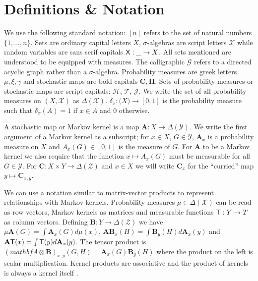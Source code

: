 
\section{Definitions \& Notation}\label{sec:dfin}

We use the following standard notation: $[n]$ refers to the set of natural numbers $\{1,...,n\}$. Sets are ordinary capital letters $X$, $\sigma$-algebras are script letters $\mathcal{X}$ while random variables are sans serif capitals $\mathsf{X}:\_\to X$. All sets mentioned are understood to be equipped with measures. The calligraphic $\mathcal{G}$ refers to a directed acyclic graph rather than a $\sigma$-algebra. Probability measures are greek letters $\mu,\xi,\gamma$ and stochastic maps are bold capitals $\mathbf{C},\mathbf{H}$. Sets of probability measures or stochastic maps are script capitals: $\mathscr{H}$, $\mathscr{T}$, $\mathscr{J}$. We write the set of all probability measures on $(X,\mathcal{X})$ as $\Delta(\mathcal{X})$. $\delta_x:\mathcal(X)\to [0,1]$ is the probability measure such that $\delta_x(A)=1$ if $x\in A$ and $0$ otherwise.

A stochastic map or Markov kernel is a map $\mathbf{A}:X\to \Delta(\mathcal{Y})$. We write the first argument of a Markov kernel as a subscript; for $x\in X$, $G\in\mathcal{Y}$, $\mathbf{A}_x$ is a probability measure on $X$ and $A_x(G)\in[0,1]$ is the measure of $G$. For $\mathbf{A}$ to be a Markov kernel we also require that the function $x\mapsto A_x(G)$ must be measurable for all $G\in\mathcal{Y}$. For $\mathbf{C}:X\times Y\to \Delta(\mathcal{Z})$  and $x\in X$ we will write $\mathbf{C}_x$ for the ``curried'' map $y\mapsto \mathbf{C}_{x,y}$.

We can use a notation similar to matrix-vector products to represent relationships with Markov kernels. Probability measures $\mu\in \Delta(\mathcal{X})$ can be read as row vectors, Markov kernels as matrices and measurable functions $\mathsf{T}:Y\to T$ as column vectors. Defining $\mathbf{B}:Y\to \Delta(\mathcal{Z})$ we have $\mu \mathbf{A} (G) = \int \mathbf{A}_x (G) d\mu(x)$, $\mathbf{A}\mathbf{B}_x(H)=\int \mathbf{B}_y(H)d\mathbf{A}_x(y)$ and $\mathbf{A}\mathsf{T}(x)=\int \mathsf{T}(y) d\mathbf{A}_x(y)$. The tensor product is $(mathbf{A}\otimes \mathbf{B})_{x,y}(G,H) = \mathbf{A}_x(G)\mathbf{B}_y(H)$ where the product on the left is scalar multiplication. Kernel products are associative and the product of kernels is always a kernel itself \citep{cinlar_probability_2011}. 


